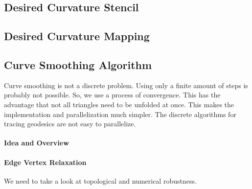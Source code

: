\documentclass{stdlocal}
\begin{document}

\subsection{Desired Curvature Stencil} %
\label{sub:desired_curvature_stencil}


\subsection{Desired Curvature Mapping} %
\label{sub:desired_curvature_mapping}


\subsection{Curve Smoothing Algorithm} %
\label{sub:curve_smoothing_algorithm}
  Curve smoothing is not a discrete problem.
  Using only a finite amount of steps is probably not possible.
  So, we use a process of convergence.
  This has the advantage that not all triangles need to be unfolded at once.
  This makes the implementation and parallelization much simpler.
  The discrete algorithms for tracing geodesics are not easy to parallelize.

  \paragraph{Idea and Overview}
  \paragraph{Edge Vertex Relaxation}
    We need to take a look at topological and numerical robustness.
\end{document}
